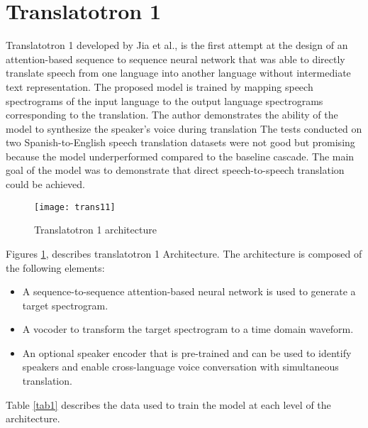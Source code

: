 \documentclass[12pt]{article}
\begin{document}
\section{Translatotron 1}
Translatotron 1 developed by Jia et al.,\cite{jia} is the first attempt at the design of an attention-based sequence to sequence neural network that was able to directly translate speech from one language into another language without intermediate text representation. The proposed model is trained by mapping speech spectrograms of the input language to the output language spectrograms corresponding to the translation. The author demonstrates the ability of the model to synthesize the speaker's voice during translation The tests conducted on two Spanish-to-English speech translation datasets were not good but promising because the model underperformed compared to the baseline cascade. The main goal of the model was to demonstrate that direct speech-to-speech translation could be achieved.

\begin{figure}[htbp]
    \centering
    \texttt{[image: trans11]} 
    \caption{Translatotron 1 architecture \cite{jia}}
    \label{trans1}
\end{figure}


Figures \ref{trans1}, describes translatotron 1 Architecture. The architecture is composed of the following elements: 
\begin{itemize}
\item  A sequence-to-sequence attention-based neural network is used to generate a target spectrogram. 
\item A vocoder to transform the target spectrogram to a time domain waveform. 
\item An optional speaker encoder that is pre-trained and can be used to identify speakers and enable cross-language voice conversation with simultaneous translation.
\end{itemize}
Table \ref{tab1} describes the data used to train the model at each level of the architecture.
\end{document}
